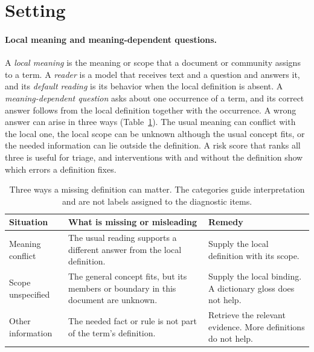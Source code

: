 \section{Setting}
\label{sec:meaning}
\paragraph{Local meaning and meaning-dependent questions.}
A \emph{local meaning} is the meaning or scope that a document or community assigns to a term. A \emph{reader} is a model that receives text and a question and answers it, and its \emph{default reading} is its behavior when the local definition is absent. A \emph{meaning-dependent question} asks about one occurrence of a term, and its correct answer follows from the local definition together with the occurrence. A wrong answer can arise in three ways (Table~\ref{tab:cases}). The usual meaning can conflict with the local one, the local scope can be unknown although the usual concept fits, or the needed information can lie outside the definition. A risk score that ranks all three is useful for triage, and interventions with and without the definition show which errors a definition fixes.

\begin{table}[t]
\centering\small
\caption{Three ways a missing definition can matter. The categories guide interpretation and are not labels assigned to the diagnostic items.}
\label{tab:cases}
\begin{tabular}{@{}>{\raggedright\arraybackslash}p{2.7cm}>{\raggedright\arraybackslash}p{5.4cm}>{\raggedright\arraybackslash}p{5.0cm}@{}}
\toprule
Situation & What is missing or misleading & Remedy\\\midrule
Meaning conflict & The usual reading supports a different answer from the local definition. & Supply the local definition with its scope.\\
Scope unspecified & The general concept fits, but its members or boundary in this document are unknown. & Supply the local binding. A dictionary gloss does not help.\\
Other information & The needed fact or rule is not part of the term's definition. & Retrieve the relevant evidence. More definitions do not help.\\\bottomrule
\end{tabular}
\end{table}

